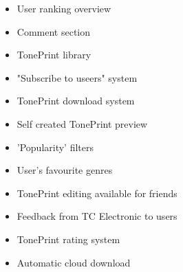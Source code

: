 \begin{itemize}
    \item User ranking overview
    \item Comment section
    \item TonePrint library
    \item "Subscribe to useers" system
    \item TonePrint download system
    \item Self created TonePrint preview
    \item 'Popularity' filters
    \item User's favourite genres
    \item TonePrint editing available for friends
    \item Feedback from TC Electronic to users
    \item  TonePrint rating system 
    \item Automatic cloud download
\end{itemize}
\pagebreak

\begin{figure}
	\centering
	
\end{figure}